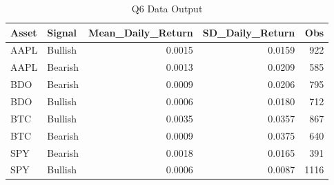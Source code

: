 \begin{table}[H]
\centering
\caption{Q6 Data Output}
\label{tab:q6}
\begin{tabular}{llrrr}
\toprule
Asset & Signal & Mean\_Daily\_Return & SD\_Daily\_Return & Obs \\
\midrule
AAPL & Bullish & 0.0015 & 0.0159 & 922 \\
AAPL & Bearish & 0.0013 & 0.0209 & 585 \\
BDO & Bearish & 0.0009 & 0.0206 & 795 \\
BDO & Bullish & 0.0006 & 0.0180 & 712 \\
BTC & Bullish & 0.0035 & 0.0357 & 867 \\
BTC & Bearish & 0.0009 & 0.0375 & 640 \\
SPY & Bearish & 0.0018 & 0.0165 & 391 \\
SPY & Bullish & 0.0006 & 0.0087 & 1116 \\
\bottomrule
\end{tabular}
\end{table}
